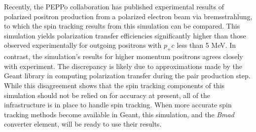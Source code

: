 \documentclass[letter,
               biblatex,     %
               keeplastbox,   %
               ]{jacow}
\newcommand{\bmad}{\textit{Bmad}\xspace}
\begin{document}
Recently, the PEPPo collaboration %
has published experimental results of polarized positron production from a polarized electron beam via bremsstrahlung, to which the spin tracking results from this simulation can be compared.
This simulation yields polarization transfer efficiencies significantly higher than those observed experimentally for outgoing positrons with $p_+ c$ less than 5 MeV.
In contrast, the simulation's results for higher momentum positrons agrees closely with experiment.
The discrepancy is likely due to approximations made by the Geant library in computing polarization transfer during the pair production step. %
While this disagreement shows that the spin tracking components of this simulation should not be relied on for accuracy at present, all of the infrastructure is in place to handle spin tracking.
When more accurate spin tracking methods become available in Geant, this simulation, and the \bmad \, converter element, will be ready to use their results.
\end{document}
